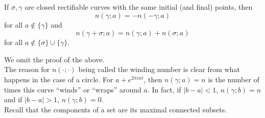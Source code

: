 		\begin{prop}
			If $\sigma,\gamma$ are closed rectifiable curves with the same initial (and final) points, then
			\begin{equation}
				n(\gamma;a) = -n(-\gamma;a)
			\end{equation}
			for all $a \not\in \{\gamma\}$ and
			\begin{equation}
				n(\gamma+\sigma;a) = n(\gamma;a) + n(\sigma;a)
			\end{equation}
			for all $a \not\in \{\sigma\} \cup \{\gamma\}$.
		\end{prop}
		We omit the proof of the above.\\

		The reason for $n(\cdot;\cdot)$ being called the winding number is clear from what happens in the case of a circle. For $a + e^{2\pi\iota n t}$, then $n(\gamma;a) = n$ is the number of times this curve ``winds'' or ``wraps'' around $a$. In fact, if $|b-a| < 1$, $n(\gamma;b) = n$ and if $|b-a| > 1$, $n(\gamma;b) = 0$.\\

		Recall that the components of a set are its maximal connected subsets.


